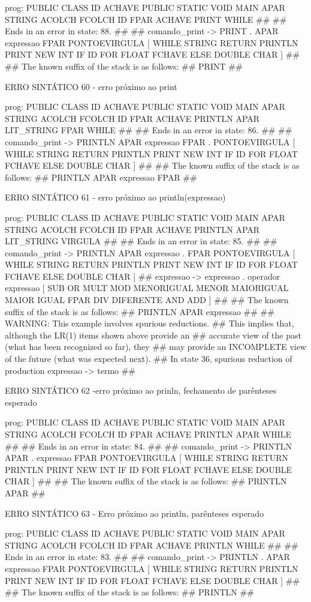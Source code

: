 \documentclass[12pt,a4paper,twoside]{report}
\begin{document}
\begin{terminal}
{prog: PUBLIC CLASS ID ACHAVE PUBLIC STATIC VOID MAIN APAR STRING ACOLCH FCOLCH ID FPAR ACHAVE PRINT WHILE 
##
## Ends in an error in state: 88.
##
## comando_print -> PRINT . APAR expressao FPAR PONTOEVIRGULA [ WHILE STRING RETURN PRINTLN PRINT NEW INT IF ID FOR FLOAT FCHAVE ELSE DOUBLE CHAR ]
##
## The known suffix of the stack is as follows:
## PRINT 
##

ERRO SINTÁTICO 60 - erro próximo ao print

prog: PUBLIC CLASS ID ACHAVE PUBLIC STATIC VOID MAIN APAR STRING ACOLCH FCOLCH ID FPAR ACHAVE PRINTLN APAR LIT_STRING FPAR WHILE 
##
## Ends in an error in state: 86.
##
## comando_print -> PRINTLN APAR expressao FPAR . PONTOEVIRGULA [ WHILE STRING RETURN PRINTLN PRINT NEW INT IF ID FOR FLOAT FCHAVE ELSE DOUBLE CHAR ]
##
## The known suffix of the stack is as follows:
## PRINTLN APAR expressao FPAR 
##

ERRO SINTÁTICO 61 - erro próximo ao println(expressao)

prog: PUBLIC CLASS ID ACHAVE PUBLIC STATIC VOID MAIN APAR STRING ACOLCH FCOLCH ID FPAR ACHAVE PRINTLN APAR LIT_STRING VIRGULA 
##
## Ends in an error in state: 85.
##
## comando_print -> PRINTLN APAR expressao . FPAR PONTOEVIRGULA [ WHILE STRING RETURN PRINTLN PRINT NEW INT IF ID FOR FLOAT FCHAVE ELSE DOUBLE CHAR ]
## expressao -> expressao . operador expressao [ SUB OR MULT MOD MENORIGUAL MENOR MAIORIGUAL MAIOR IGUAL FPAR DIV DIFERENTE AND ADD ]
##
## The known suffix of the stack is as follows:
## PRINTLN APAR expressao 
##
## WARNING: This example involves spurious reductions.
## This implies that, although the LR(1) items shown above provide an
## accurate view of the past (what has been recognized so far), they
## may provide an INCOMPLETE view of the future (what was expected next).
## In state 36, spurious reduction of production expressao -> termo 
##

ERRO SINTÁTICO 62 -erro próximo ao prinln, fechamento de parênteses esperado

prog: PUBLIC CLASS ID ACHAVE PUBLIC STATIC VOID MAIN APAR STRING ACOLCH FCOLCH ID FPAR ACHAVE PRINTLN APAR WHILE 
##
## Ends in an error in state: 84.
##
## comando_print -> PRINTLN APAR . expressao FPAR PONTOEVIRGULA [ WHILE STRING RETURN PRINTLN PRINT NEW INT IF ID FOR FLOAT FCHAVE ELSE DOUBLE CHAR ]
##
## The known suffix of the stack is as follows:
## PRINTLN APAR 
##

ERRO SINTÁTICO 63 - Erro próximo ao println, parênteses esperado

prog: PUBLIC CLASS ID ACHAVE PUBLIC STATIC VOID MAIN APAR STRING ACOLCH FCOLCH ID FPAR ACHAVE PRINTLN WHILE 
##
## Ends in an error in state: 83.
##
## comando_print -> PRINTLN . APAR expressao FPAR PONTOEVIRGULA [ WHILE STRING RETURN PRINTLN PRINT NEW INT IF ID FOR FLOAT FCHAVE ELSE DOUBLE CHAR ]
##
## The known suffix of the stack is as follows:
## PRINTLN 
##

}
\end{terminal}
\end{document}
